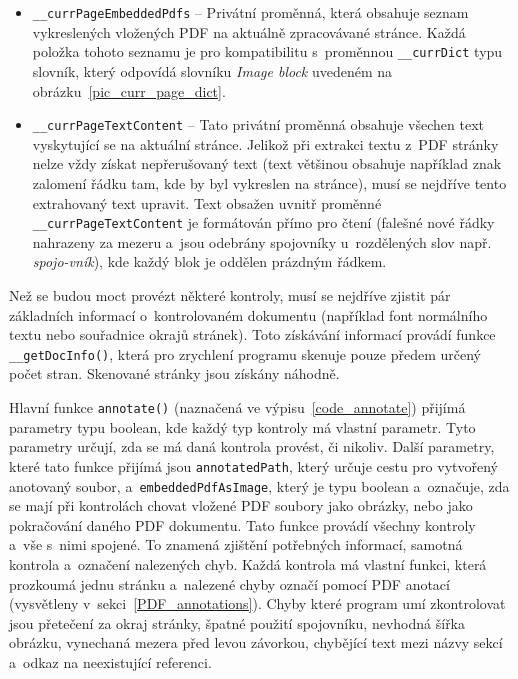 \begin{itemize}
    \item \texttt{\_\_currPageEmbeddedPdfs} -- Privátní proměnná, která obsahuje
    seznam vykreslených vložených PDF na aktuálně zpracovávané stránce. Každá
    položka tohoto seznamu je pro kompatibilitu s~proměnnou \texttt{\_\_currDict}
    typu slovník, který odpovídá slovníku \emph{Image block} uvedeném na
    obrázku~\ref{pic_curr_page_dict}. 
    
    \item \texttt{\_\_currPageTextContent} -- Tato privátní proměnná obsahuje
    všechen text vyskytující se na aktuální stránce. Jelikož při extrakci textu
    z~PDF stránky nelze vždy získat nepřerušovaný text (text většinou obsahuje
    například znak
    zalomení řádku tam, kde by byl vykreslen na stránce), musí se nejdříve tento
    extrahovaný text upravit.
    Text obsažen uvnitř proměnné \texttt{\_\_currPageTextContent} je formátován
    přímo pro čtení (falešné nové řádky nahrazeny za mezeru a~jsou odebrány
    spojovníky u~rozdělených slov např. \emph{spojo-vník}), kde každý blok je
    oddělen prázdným
    řádkem.
\end{itemize}

Než se budou moct provézt některé kontroly, musí se nejdříve zjistit pár
základních informací o~kontrolovaném dokumentu (například font normálního textu
nebo souřadnice okrajů stránek). Toto získávání informací provádí funkce
\texttt{\_\_getDocInfo()}, která pro zrychlení programu skenuje pouze předem
určený počet stran. Skenované stránky jsou získány náhodně.

% 

Hlavní funkce \texttt{annotate()} (naznačená ve výpisu~\ref{code_annotate}) přijímá parametry typu boolean, kde
každý typ kontroly má vlastní parametr. Tyto parametry určují, zda se má daná
kontrola provést, či nikoliv. Další parametry, které tato funkce přijímá jsou
\texttt{annotatedPath}, který určuje cestu pro vytvořený anotovaný soubor,
a~\texttt{embeddedPdfAsImage}, který je typu boolean a~označuje, zda se mají
při kontrolách chovat vložené PDF soubory jako obrázky, nebo jako pokračování
daného PDF dokumentu. Tato funkce provádí všechny kontroly a~vše s~nimi spojené.
To znamená zjištění potřebných informací, samotná kontrola a~označení nalezených
chyb. Každá kontrola má vlastní funkci, která prozkoumá jednu stránku a~nalezené
chyby označí pomocí PDF anotací (vysvětleny v~sekci~\ref{PDF_annotations}).
Chyby které program umí zkontrolovat jsou přetečení za okraj stránky, 
špatné použití spojovníku, nevhodná šířka obrázku, vynechaná mezera před levou
závorkou, chybějící text mezi názvy sekcí a~odkaz na neexistující referenci.

